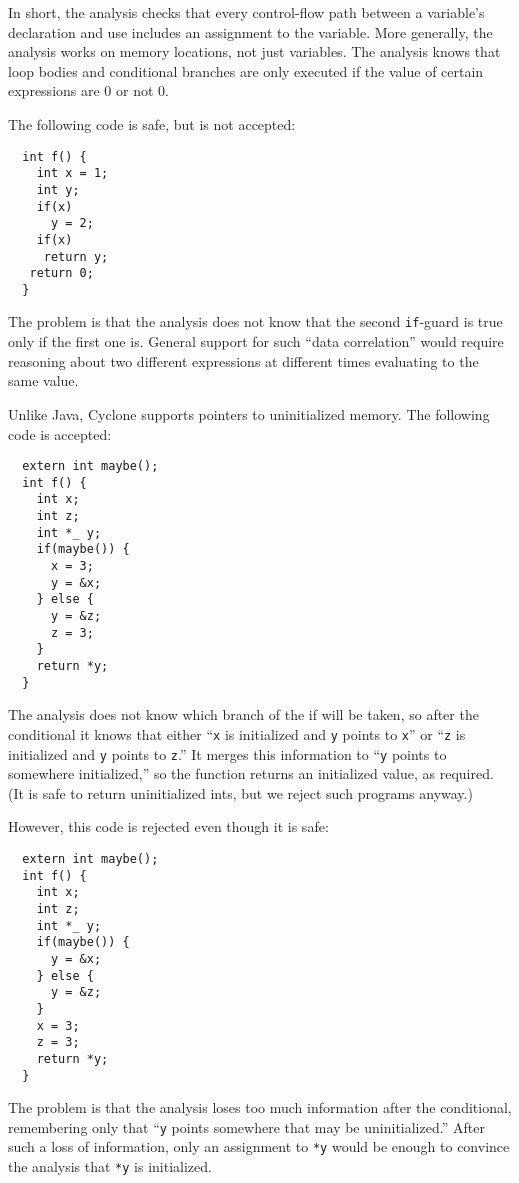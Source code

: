 In short, the analysis checks that every control-flow path between a
variable's declaration and use includes an assignment to the variable.
More generally, the analysis works on memory locations, not just
variables.  The analysis knows that loop bodies and conditional
branches are only executed if the value of certain expressions are 0
or not 0.

The following code is safe, but is not accepted:
\begin{verbatim}
  int f() {
    int x = 1;
    int y;
    if(x) 
      y = 2;
    if(x)
     return y;
   return 0;
  }
\end{verbatim}

The problem is that the analysis does not know that the second
\texttt{if}-guard is true only if the first one is.  General support for
such ``data correlation'' would require reasoning about two different
expressions at different times evaluating to the same value.

Unlike Java, Cyclone supports pointers to uninitialized memory.  The
following code is accepted:
\begin{verbatim}
  extern int maybe();
  int f() {
    int x;
    int z;
    int *_ y;
    if(maybe()) {
      x = 3;
      y = &x;
    } else {
      y = &z;
      z = 3;
    }
    return *y;
  }
\end{verbatim}

The analysis does not know which branch of the if will be taken, so
after the conditional it knows that either ``\texttt{x} is initialized
and \texttt{y} points to \texttt{x}'' or ``\texttt{z} is initialized and
\texttt{y} points to \texttt{z}.''  It merges this information to
``\texttt{y} points to somewhere initialized,'' so the function returns
an initialized value, as required.  (It is safe to return
uninitialized ints, but we reject such programs anyway.)

However, this code is rejected even though it is safe:
\begin{verbatim}
  extern int maybe();
  int f() {
    int x;
    int z;
    int *_ y;
    if(maybe()) {
      y = &x;
    } else {
      y = &z;
    }
    x = 3;
    z = 3;
    return *y;
  }
\end{verbatim}

The problem is that the analysis loses too much information after the
conditional, remembering only that ``\texttt{y} points somewhere that
may be uninitialized.''  After such a loss of information, only an
assignment to \texttt{*y} would be enough to convince the analysis that
\texttt{*y} is initialized.

